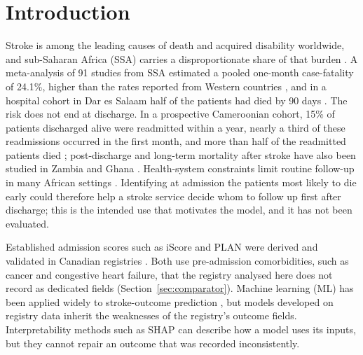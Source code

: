 \documentclass[preprint,10pt]{elsarticle}
\begin{document}
\section{Introduction}
Stroke is among the leading causes of death and acquired disability worldwide, and sub-Saharan Africa (SSA) carries a disproportionate share of that burden \cite{owolabi2015burden,akinyemi2021stroke}. A meta-analysis of 91 studies from SSA estimated a pooled one-month case-fatality of 24.1\%, higher than the rates reported from Western countries \cite{adoukonou2021stroke}, and in a hospital cohort in Dar es Salaam half of the patients had died by 90 days \cite{regenhardt2019opportunities}. The risk does not end at discharge. In a prospective Cameroonian cohort, 15\% of patients discharged alive were readmitted within a year, nearly a third of these readmissions occurred in the first month, and more than half of the readmitted patients died \cite{nkoke2024readmission}; post-discharge and long-term mortality after stroke have also been studied in Zambia and Ghana \cite{nutakki2022predictors,sarfo2022determinants}. Health-system constraints limit routine follow-up in many African settings \cite{oleribe2019identifying}. Identifying at admission the patients most likely to die early could therefore help a stroke service decide whom to follow up first after discharge; this is the intended use that motivates the model, and it has not been evaluated.

Established admission scores such as iScore and PLAN were derived and validated in Canadian registries \cite{saposnik2011iscore,odonnell2012plan}. Both use pre-admission comorbidities, such as cancer and congestive heart failure, that the registry analysed here does not record as dedicated fields (Section~\ref{sec:comparator}). Machine learning (ML) has been applied widely to stroke-outcome prediction \cite{abujaber2024machine,klug2024machine}, but models developed on registry data inherit the weaknesses of the registry's outcome fields. Interpretability methods such as SHAP \cite{lundberg2017shap,vimbi2024interpreting,salih2024perspective} can describe how a model uses its inputs, but they cannot repair an outcome that was recorded inconsistently.
\end{document}
